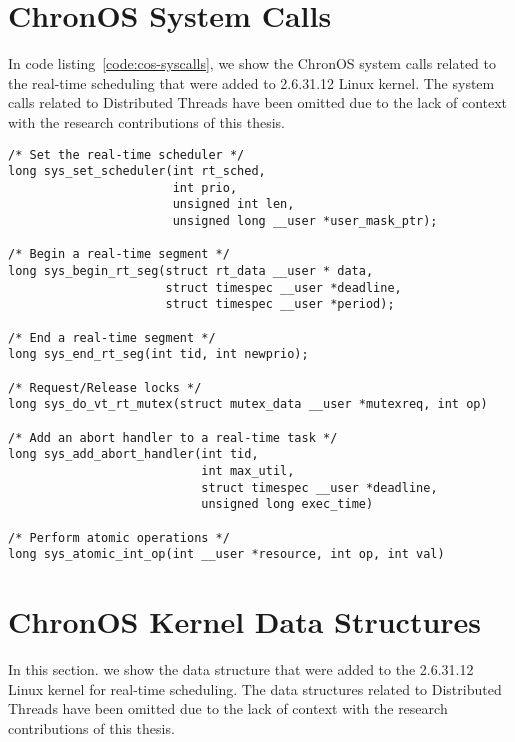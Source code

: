 \documentclass[12pt,dvips]{report}
\begin{document}
\appendix

\chapter{ChronOS System Calls}\label{appendix-cos-sys}


In code listing~\ref{code:cos-syscalls}, we show the ChronOS system calls related to the real-time scheduling that were added to 2.6.31.12 Linux kernel. The system calls related to Distributed Threads have been omitted due to the lack of context with the research contributions of this thesis.
~\\

\begin{lstlisting}[caption=The ChronOS system calls added to the Linux 2.6.31.12 kernel, label=code:cos-syscalls]
/* Set the real-time scheduler */
long sys_set_scheduler(int rt_sched,
					   int prio,
				  	   unsigned int len,
					   unsigned long __user *user_mask_ptr);

/* Begin a real-time segment */
long sys_begin_rt_seg(struct rt_data __user * data,
					  struct timespec __user *deadline,
					  struct timespec __user *period);

/* End a real-time segment */			  
long sys_end_rt_seg(int tid, int newprio);

/* Request/Release locks */
long sys_do_vt_rt_mutex(struct mutex_data __user *mutexreq, int op)

/* Add an abort handler to a real-time task */
long sys_add_abort_handler(int tid,
						   int max_util,
						   struct timespec __user *deadline,
						   unsigned long exec_time)

/* Perform atomic operations */
long sys_atomic_int_op(int __user *resource, int op, int val)
\end{lstlisting}

\chapter{ChronOS Kernel Data Structures}\label{appendix-cos-ds}

In this section. we show the data structure that were added to the 2.6.31.12 Linux kernel for real-time scheduling. The data structures related to Distributed Threads have been omitted due to the lack of context with the research contributions of this thesis.
~\\
\end{document}
